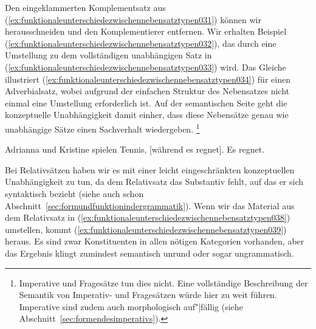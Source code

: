 Den eingeklammerten Komplementsatz aus (\ref{ex:funktionaleunterschiedezwischennebensatztypen031}) können wir herausschneiden und den Komplementierer entfernen.
Wir erhalten Beispiel (\ref{ex:funktionaleunterschiedezwischennebensatztypen032}), das durch eine Umstellung zu dem vollständigen unabhängigen Satz in (\ref{ex:funktionaleunterschiedezwischennebensatztypen033}) wird.
Das Gleiche illustriert (\ref{ex:funktionaleunterschiedezwischennebensatztypen034}) für einen Adverbialsatz, wobei aufgrund der einfachen Struktur des Nebensatzes nicht einmal eine Umstellung erforderlich ist.
Auf der semantischen Seite geht die konzeptuelle Unabhängigkeit damit einher, dass diese Nebensätze genau wie unabhängige Sätze einen Sachverhalt wiedergeben.%
\footnote{Imperative und Fragesätze tun dies nicht.
Eine vollständige Beschreibung der Semantik von Imperativ- und Fragesätzen würde hier zu weit führen.
Imperative sind zudem auch morphologisch auf"|fällig (siehe Abschnitt~\ref{sec:formendesimperativs}).}


\begin{exe}
  \ex\label{ex:funktionaleunterschiedezwischennebensatztypen034}
  \begin{xlist}
    \ex\label{ex:funktionaleunterschiedezwischennebensatztypen035} Adrianna und Kristine spielen Tennis, [während es regnet].
    \ex\label{ex:funktionaleunterschiedezwischennebensatztypen036} Es regnet.
  \end{xlist}
\end{exe}


Bei Relativsätzen haben wir es mit einer leicht eingeschränkten konzeptuellen Unabhängigkeit zu tun, da dem Relativsatz das Substantiv fehlt, auf das er sich syntaktisch bezieht (siehe auch schon Abschnitt~\ref{sec:formundfunktionindergrammatik}).
Wenn wir das Material aus dem Relativsatz in (\ref{ex:funktionaleunterschiedezwischennebensatztypen038}) umstellen, kommt (\ref{ex:funktionaleunterschiedezwischennebensatztypen039}) heraus.
Es sind zwar Konstituenten in allen nötigen Kategorien vorhanden, aber das Ergebnis klingt zumindest semantisch unrund oder sogar ungrammatisch.

\begin{exe}
  \ex\label{ex:funktionaleunterschiedezwischennebensatztypen037}
  \begin{xlist}
  \end{xlist}
\end{exe}

